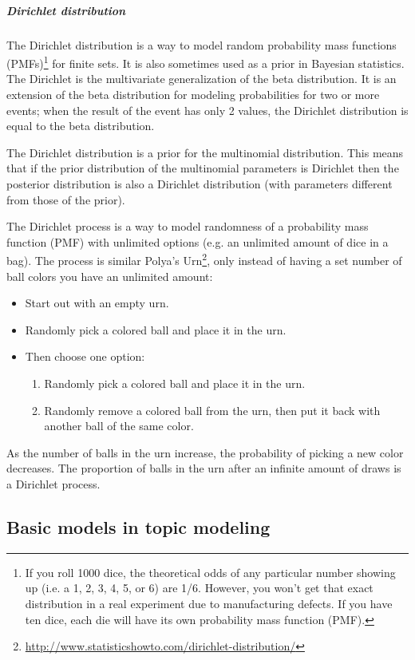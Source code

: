\documentclass[12pt]{report}
\begin{document}
\subparagraph{Dirichlet distribution}

The Dirichlet distribution is a way to model random probability mass functions
(PMFs)\footnote{If you roll 1000 dice, the theoretical odds of any particular
number showing up (i.e. a 1, 2, 3, 4, 5, or 6) are 1/6. However, you won’t get
that exact distribution in a real experiment due to manufacturing defects. If
you have ten dice, each die will have its own probability mass function (PMF).}
for finite sets. It is also sometimes used as a prior in Bayesian statistics.
The Dirichlet is the multivariate generalization of the beta distribution. It
is an extension of the beta distribution for modeling probabilities for two or
more events; when the result of the event has only 2 values, the Dirichlet
distribution is equal to the beta distribution.

The Dirichlet distribution is a prior for the multinomial distribution. This
means that if the prior distribution of the multinomial parameters is Dirichlet
then the posterior distribution is also a Dirichlet distribution (with
parameters different from those of the prior).

The Dirichlet process is a way to model randomness of a probability mass
function (PMF) with unlimited options (e.g. an unlimited amount of dice in a
bag). The process is similar Polya’s Urn\footnote{\url{http://www.statisticshowto.com/dirichlet-distribution/}}, only instead of having a set number
of ball colors you have an unlimited amount:

\begin{itemize}
\item Start out with an empty urn.
\item Randomly pick a colored ball and place it in the urn.
\item Then choose one option:
\begin{enumerate}
\item Randomly pick a colored ball and place it in the urn.
\item Randomly remove a colored ball from the urn, then put it back with another 
ball of the same color.
\end{enumerate}
\end{itemize}
 
As the number of balls in the urn increase, the probability of picking a new
color decreases. The proportion of balls in the urn after an infinite amount of
draws is a Dirichlet process.


\subsection{Basic models in topic modeling}
\end{document}
